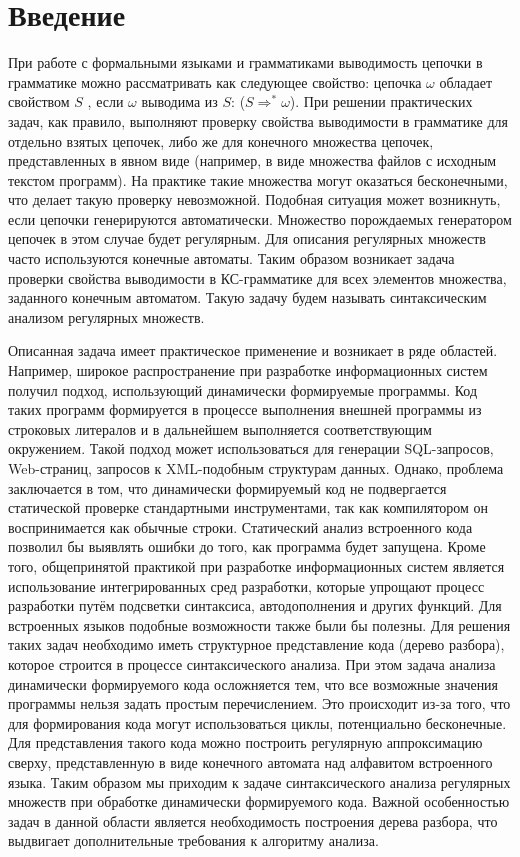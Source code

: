 \documentclass[14pt]{matmex-diploma}
\begin{document}
\section*{Введение}
При работе с формальными языками и грамматиками выводимость цепочки в грамматике можно рассматривать как следующее свойство: цепочка $\omega$ обладает свойством $S$ , если $\omega$ выводима из $S$: ($S \Rightarrow^* \omega $). При решении практических задач, как правило, выполняют проверку свойства выводимости в грамматике для отдельно взятых цепочек, либо же для конечного множества цепочек, представленных в явном виде (например, в виде множества файлов с исходным текстом программ). На практике такие множества могут оказаться бесконечными, что делает такую проверку невозможной. Подобная ситуация может возникнуть, если цепочки генерируются автоматически. Множество порождаемых генератором цепочек в этом случае будет регулярным. Для описания регулярных множеств часто используются конечные автоматы. Таким образом возникает задача проверки свойства выводимости в КС-грамматике для всех элементов множества, заданного конечным автоматом. Такую задачу будем называть синтаксическим анализом регулярных множеств. 
	
Описанная задача имеет практическое применение и возникает в ряде областей. Например, широкое распространение при разработке информационных систем получил подход, использующий динамически формируемые программы. Код таких программ формируется в процессе выполнения внешней программы из строковых литералов и в дальнейшем выполняется соответствующим окружением. Такой подход может использоваться для генерации SQL-запросов, Web-страниц, запросов к XML-подобным структурам данных. Однако, проблема заключается в том, что динамически формируемый код не подвергается статической проверке стандартными инструментами, так как компилятором он воспринимается как обычные строки. Статический анализ встроенного кода позволил бы выявлять ошибки до того, как программа будет запущена. Кроме того, общепринятой практикой при разработке информационных систем является использование интегрированных сред разработки, которые упрощают процесс разработки путём подсветки синтаксиса, автодополнения и других функций. Для встроенных языков подобные возможности также были бы полезны. Для решения таких задач необходимо иметь структурное представление кода (дерево разбора), которое строится в процессе синтаксического анализа. При этом задача анализа динамически формируемого кода осложняется тем, что все возможные значения программы нельзя задать простым перечислением. Это происходит из-за того, что для формирования кода могут использоваться циклы, потенциально бесконечные. Для представления такого кода можно построить регулярную аппроксимацию сверху, представленную в виде конечного автомата над алфавитом встроенного языка. Таким образом мы приходим к задаче синтаксического анализа регулярных множеств при обработке динамически формируемого кода. Важной особенностью задач в данной области является необходимость построения дерева разбора, что выдвигает дополнительные требования к алгоритму анализа.
\end{document}
